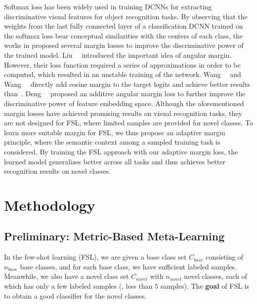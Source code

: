 \documentclass[10pt,twocolumn,letterpaper]{article}
\begin{document}
Softmax loss has been widely used in training DCNNs for extracting discriminative visual features for object recognition tasks. By observing that the weights from the last fully connected layer of a classification DCNN trained on the softmax loss bear conceptual similarities with the centers of each class, the works in \cite{Deng2019cvpr,Wang2018cvprCosface,Liu2017cvprsphere} proposed several margin losses to improve the discriminative power of the trained model. Liu~\etal~\cite{Liu2017cvprsphere} introduced the important idea of angular margin. However, their loss function required a series of approximations in order to be computed, which resulted in an unstable training of the network. Wang~\etal~\cite{Wang2018iclrws} and Wang~\etal~\cite{Wang2018cvprCosface} directly add cosine margin to the target logits and achieve better results than~\cite{Liu2017cvprsphere}. Deng~\etal~\cite{Deng2019cvpr} proposed an additive angular margin loss to further improve the discriminative power of feature embedding space. Although the aforementioned margin losses have achieved promising results on visual recognition tasks, they are not designed for FSL, where limited samples are provided for novel classes. To learn more suitable margin for FSL, we thus propose an adaptive margin principle, where the semantic context among a sampled training task is considered. By training the FSL approach with our adaptive margin loss, the learned model generalizes better across all tasks and thus achieves better recognition results on novel classes.

\section{Methodology}

\subsection{Preliminary: Metric-Based Meta-Learning}

In the few-shot learning (FSL), we are given a base class set $C_{base}$ consisting of $n_{base}$ base classes, and for each base class, we have sufficient labeled samples.
Meanwhile, we also have a novel class set $C_{novel}$ with $n_{novel}$ novel classes, each of which has only a few labeled
samples (\eg, less than 5 samples).
The {\bf goal} of FSL is to obtain a good classifier for the novel classes. 
\end{document}
